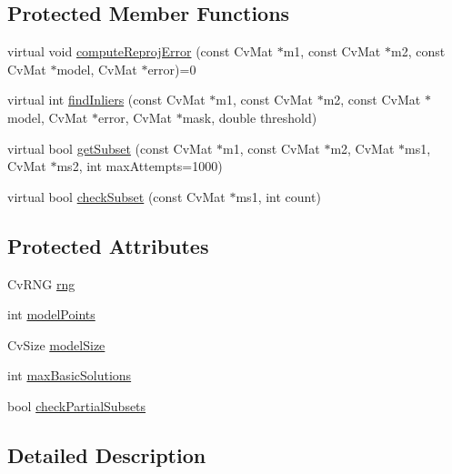 \subsection*{Protected Member Functions}
\begin{DoxyCompactItemize}
\item 
virtual void \hyperlink{class_cv_model_estimator2_ae2aa4bbc11e6fc303d81b95daf2795ad}{compute\+Reproj\+Error} (const Cv\+Mat $\ast$m1, const Cv\+Mat $\ast$m2, const Cv\+Mat $\ast$model, Cv\+Mat $\ast$error)=0
\item 
virtual int \hyperlink{class_cv_model_estimator2_a7683a8352f66ba994982493690f418b1}{find\+Inliers} (const Cv\+Mat $\ast$m1, const Cv\+Mat $\ast$m2, const Cv\+Mat $\ast$model, Cv\+Mat $\ast$error, Cv\+Mat $\ast$mask, double threshold)
\item 
virtual bool \hyperlink{class_cv_model_estimator2_a8a1749e60a02a5cb697425bd2daa35af}{get\+Subset} (const Cv\+Mat $\ast$m1, const Cv\+Mat $\ast$m2, Cv\+Mat $\ast$ms1, Cv\+Mat $\ast$ms2, int max\+Attempts=1000)
\item 
virtual bool \hyperlink{class_cv_model_estimator2_ae149bd480d9b445c66b1c34a351cbb5a}{check\+Subset} (const Cv\+Mat $\ast$ms1, int count)
\end{DoxyCompactItemize}
\subsection*{Protected Attributes}
\begin{DoxyCompactItemize}
\item 
Cv\+R\+NG \hyperlink{class_cv_model_estimator2_a5199037f573a5af1bd9f419e5a64e3e4}{rng}
\item 
int \hyperlink{class_cv_model_estimator2_a7c4067aa8938e61ca4b2674a58ccfe35}{model\+Points}
\item 
Cv\+Size \hyperlink{class_cv_model_estimator2_a93286a6b978450e6363b2403b5da1ff5}{model\+Size}
\item 
int \hyperlink{class_cv_model_estimator2_ac954ec76553da0908f863c48aa82d1ef}{max\+Basic\+Solutions}
\item 
bool \hyperlink{class_cv_model_estimator2_a579cf07784af6c3710ab23aa841cb7d5}{check\+Partial\+Subsets}
\end{DoxyCompactItemize}


\subsection{Detailed Description}


